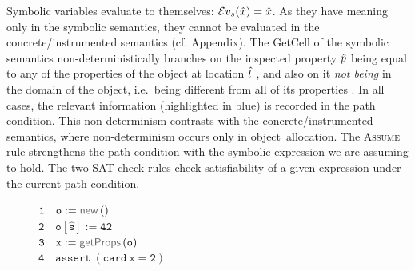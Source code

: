 \noindent Symbolic variables evaluate to themselves: $\mathcal{E}v_{s}(\hat{x}) = \hat{x}$. 
As they have meaning only in the symbolic semantics, they cannot be evaluated in the concrete/instrumented semantics (cf. Appendix). 
The GetCell of the symbolic semantics non-deterministically branches on the inspected property $\hat{p}$ being equal to any of the properties of the object at location $\hat{l}$ , and also on it \emph{not being} in the domain of the object, i.e.~being different from all of its properties . In all cases, the relevant information (highlighted in blue) is recorded in the path condition. This non-determinism contrasts with the concrete/instrumented semantics, where non-determinism occurs only in object~allocation. 
The \textsc{Assume} rule strengthens the path condition with the symbolic expression we are assuming to hold. The two SAT-check rules check satisfiability of a given expression under the current path condition. 

 

\begin{figure}
\vspace*{0.1cm}
{\footnotesize
\hspace*{-0.55cm} $\mathtt{1\quad o := \jsilnew()}$ \\[-0.06cm]
\hspace*{-0.55cm} $\mathtt{2\quad o[\hat{s}] := 42}$ \\[-0.06cm]
\hspace*{-0.55cm} $\mathtt{3\quad x := \getfields(o)}$ \\[-0.06cm]
\hspace*{-0.55cm} $\mathtt{4\quad assert\ (card \ x = 2)}$
}
\vspace*{-0.35cm}
\end{figure}


